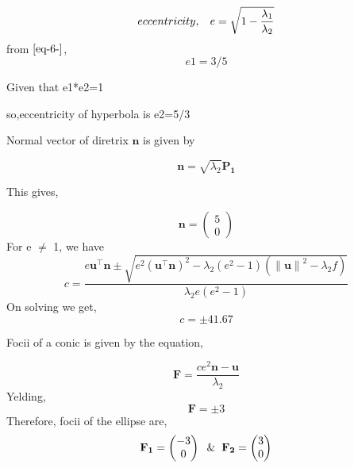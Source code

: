 \documentclass[journal,12pt,twocolumn]
{IEEEtran}
\providecommand{\norm}[1]{\left\lVert#1\right\rVert}
\let\vec\mathbf
\newcommand{\myvec}[1]{\ensuremath{\begin{pmatrix}#1\end{pmatrix}}}
\providecommand{\brak}[1]{\ensuremath{\left(#1\right)}}
\begin{document}
\begin{equation}
eccentricity, \hspace{3mm} e = \sqrt{1-\frac{\lambda_1}{\lambda_2}}
\label{eq-7-}
\end{equation}
from $\eqref{eq-6-}$,
\begin{equation}
e1=3/5
\label{eq-8-}
\end{equation}
\begin{center}
Given that e1*e2=1
\end{center}
\begin{center}
so,eccentricity of hyperbola is e2=5/3
\end{center}
\begin{center}
Normal vector of diretrix $\vec{n}$ is given by
\end{center}
\begin{equation}
\vec{n} = \sqrt{\lambda_2}\vec{P_1}
\label{eq-9-}
\end{equation}
\begin{center}
This gives,
\end{center}
\begin{equation}
\vec{n} = \myvec{5 \\ 0}
\label{eq-10-}
\end{equation}
For e $\neq$ 1, we have
\begin{equation}
c = \frac{e\vec{u}^{\top} \vec{n}\pm \sqrt{e^2\brak{\vec{u}^{\top}\vec{n}}^2 - \lambda_2 \brak{e^2-1}\brak{\norm{\vec{u}}^2-\lambda_2 f }}}{\lambda_2 e \brak{e^2-1}}
\label{eq-11-}
\end{equation}
On solving we get,
\begin{equation}
c = \pm 41.67
\label{eq-12-}
\end{equation}
\begin{center}
Focii of a conic is given by the equation,
\end{center}
\begin{equation}
\vec{F} = \frac{ce^2\vec{n}-\vec{u}}{\lambda_2}
\label{eq-13-}
\end{equation}
Yelding,
\begin{equation}
\vec{F} = \pm 3
\label{eq-14-}
\end{equation}
Therefore, focii of the ellipse are,
\begin{equation}
\vec{F_1} = \myvec{-3 \\ 0} \hspace{2mm} \& \hspace{2mm} \vec{F_2} = \myvec{3 \\ 0}
\label{eq-15-}
\end{equation}
\end{document}

